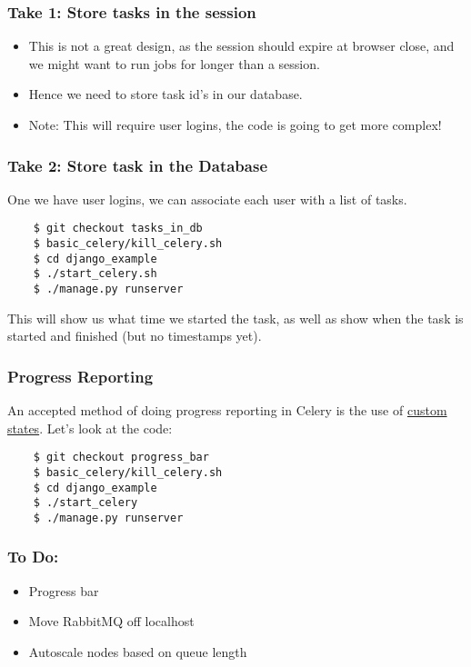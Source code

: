\documentclass[9pt]{beamer}
\begin{document}
\begin{frame}[fragile]
  \frametitle{Take 1: Store tasks in the session}
  \begin{itemize}
  \item This is not a great design, as the session should expire at browser close, and we might want to run jobs for longer than a session.
    \pause
  \item Hence we need to store task id's in our database.
    \pause
  \item Note: This will require user logins, the code is going to get more complex!
  \end{itemize}
\end{frame}

\begin{frame}[fragile]
  \frametitle{Take 2: Store task in the Database}
  One we have user logins, we can associate each user with a list of tasks.
  \begin{verbatim}
    $ git checkout tasks_in_db
    $ basic_celery/kill_celery.sh
    $ cd django_example
    $ ./start_celery.sh
    $ ./manage.py runserver
  \end{verbatim}
  This will show us what time we started the task, as well as show when the task is started and finished (but no timestamps yet).
\end{frame}

\begin{frame}[fragile]
  \frametitle{Progress Reporting}
  An accepted method of doing progress reporting in Celery is the use of \href{http://docs.celeryproject.org/en/latest/userguide/tasks.html#custom-states}{custom states}. Let's look at the code:
  \begin{verbatim}
    $ git checkout progress_bar
    $ basic_celery/kill_celery.sh
    $ cd django_example
    $ ./start_celery
    $ ./manage.py runserver
  \end{verbatim}
\end{frame}

\begin{frame}[fragile]
  \frametitle{To Do:}
  \begin{itemize}
  \item Progress bar
    \pause
  \item Move RabbitMQ off localhost
    \pause
  \item Autoscale nodes based on queue length
  \end{itemize}
\end{frame}
\end{document}
